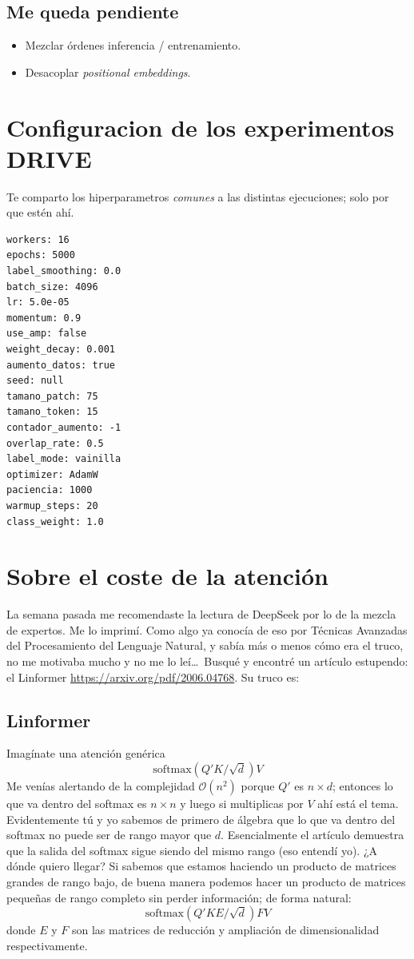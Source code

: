 \documentclass[a4paper,12pt]{article}
\begin{document}
\subsection{Me queda pendiente}

\begin{itemize}
    \item Mezclar órdenes inferencia / entrenamiento.
    \item Desacoplar \emph{positional embeddings}.
\end{itemize}

\section{Configuracion de los experimentos DRIVE}

Te comparto los hiperparametros \emph{comunes} a las distintas ejecuciones; solo por que estén ahí.

\begin{verbatim}
workers: 16
epochs: 5000
label_smoothing: 0.0
batch_size: 4096
lr: 5.0e-05
momentum: 0.9
use_amp: false
weight_decay: 0.001
aumento_datos: true
seed: null
tamano_patch: 75
tamano_token: 15
contador_aumento: -1
overlap_rate: 0.5
label_mode: vainilla
optimizer: AdamW
paciencia: 1000
warmup_steps: 20
class_weight: 1.0
\end{verbatim}

\section{Sobre el coste de la atención}

La semana pasada me recomendaste la lectura de DeepSeek por lo de la mezcla de expertos. Me lo imprimí. Como algo ya conocía de eso por Técnicas Avanzadas del Procesamiento del Lenguaje Natural, y sabía más o menos cómo era el truco, no me motivaba mucho y no me lo leí\ldots\ Busqué y encontré un artículo estupendo: el Linformer \url{https://arxiv.org/pdf/2006.04768}. Su truco es:

\subsection{Linformer}

Imagínate una atención genérica \[ \text{softmax}(Q'K/\sqrt{d})V \] Me venías alertando de la complejidad $\mathcal{O}(n^2)$ porque $Q'$ es $n \times d$; entonces lo que va dentro del softmax es $n \times n$ y luego si multiplicas por $V$ ahí está el tema. Evidentemente tú y yo sabemos de primero de álgebra que lo que va dentro del softmax no puede ser de rango mayor que $d$. Esencialmente el artículo demuestra que la salida del softmax sigue siendo del mismo rango (eso entendí yo). ¿A dónde quiero llegar? Si sabemos que estamos haciendo un producto de matrices grandes de rango bajo, de buena manera podemos hacer un producto de matrices pequeñas de rango completo sin perder información; de forma natural:
\[
    \text{softmax}(Q'KE/\sqrt{d})FV
\]
donde $E$ y $F$ son las matrices de reducción y ampliación de dimensionalidad respectivamente.
\end{document}
